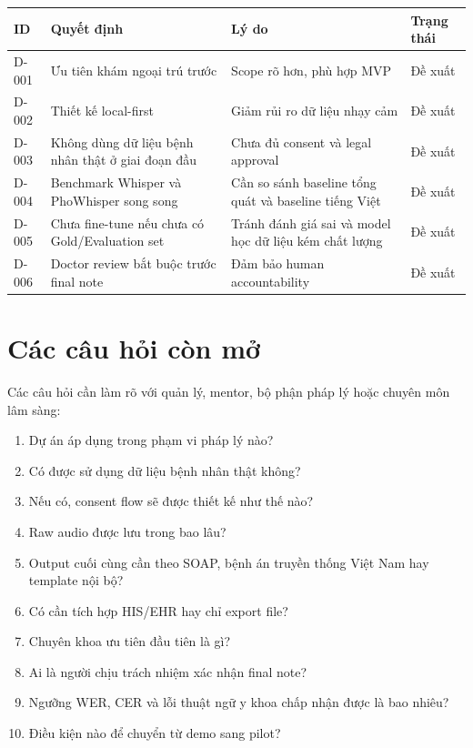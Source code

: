 \documentclass[12pt,a4paper]{article}
\begin{document}
\begin{longtable}{p{2cm} p{4cm} p{5cm} p{3cm}}
\toprule
\textbf{ID} & \textbf{Quyết định} & \textbf{Lý do} & \textbf{Trạng thái} \\
\midrule
D-001 & Ưu tiên khám ngoại trú trước & Scope rõ hơn, phù hợp MVP & Đề xuất \\
\midrule
D-002 & Thiết kế local-first & Giảm rủi ro dữ liệu nhạy cảm & Đề xuất \\
\midrule
D-003 & Không dùng dữ liệu bệnh nhân thật ở giai đoạn đầu & Chưa đủ consent và legal approval & Đề xuất \\
\midrule
D-004 & Benchmark Whisper và PhoWhisper song song & Cần so sánh baseline tổng quát và baseline tiếng Việt & Đề xuất \\
\midrule
D-005 & Chưa fine-tune nếu chưa có Gold/Evaluation set & Tránh đánh giá sai và model học dữ liệu kém chất lượng & Đề xuất \\
\midrule
D-006 & Doctor review bắt buộc trước final note & Đảm bảo human accountability & Đề xuất \\
\bottomrule
\end{longtable}

\section{Các câu hỏi còn mở}

Các câu hỏi cần làm rõ với quản lý, mentor, bộ phận pháp lý hoặc chuyên môn lâm sàng:

\begin{enumerate}
    \item Dự án áp dụng trong phạm vi pháp lý nào?
    \item Có được sử dụng dữ liệu bệnh nhân thật không?
    \item Nếu có, consent flow sẽ được thiết kế như thế nào?
    \item Raw audio được lưu trong bao lâu?
    \item Output cuối cùng cần theo SOAP, bệnh án truyền thống Việt Nam hay template nội bộ?
    \item Có cần tích hợp HIS/EHR hay chỉ export file?
    \item Chuyên khoa ưu tiên đầu tiên là gì?
    \item Ai là người chịu trách nhiệm xác nhận final note?
    \item Ngưỡng WER, CER và lỗi thuật ngữ y khoa chấp nhận được là bao nhiêu?
    \item Điều kiện nào để chuyển từ demo sang pilot?
\end{enumerate}
\end{document}
